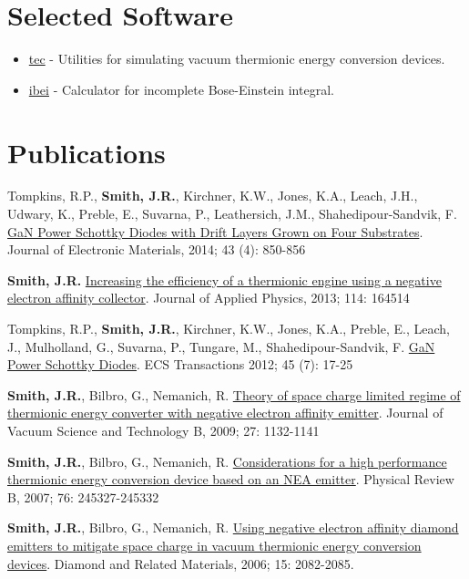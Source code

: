 \section{Selected Software}

\begin{itemize}
\tightlist
\item
  \href{http://jrsmith3.github.io/tec/}{tec} - Utilities for simulating
  vacuum thermionic energy conversion devices.
\item
  \href{http://ibei.readthedocs.org/en/latest/}{ibei} - Calculator for
  incomplete Bose-Einstein integral.
\end{itemize}

\section{Publications}

Tompkins, R.P., \textbf{Smith, J.R.}, Kirchner, K.W., Jones, K.A.,
Leach, J.H., Udwary, K., Preble, E., Suvarna, P., Leathersich, J.M.,
Shahedipour-Sandvik, F.
\href{http://dx.doi.org/10.1007/s11664-014-3021-9}{GaN Power Schottky
Diodes with Drift Layers Grown on Four Substrates}. Journal of
Electronic Materials, 2014; 43 (4): 850-856

\textbf{Smith, J.R.}
\href{http://dx.doi.org/10.1063/1.4826202}{Increasing the efficiency of
a thermionic engine using a negative electron affinity collector}.
Journal of Applied Physics, 2013; 114: 164514

Tompkins, R.P., \textbf{Smith, J.R.}, Kirchner, K.W., Jones, K.A.,
Preble, E., Leach, J., Mulholland, G., Suvarna, P., Tungare, M.,
Shahedipour-Sandvik, F. \href{http://dx.doi.org/10.1149/1.3701521}{GaN
Power Schottky Diodes}. ECS Transactions 2012; 45 (7): 17-25

\textbf{Smith, J.R.}, Bilbro, G., Nemanich, R.
\href{http://dx.doi.org/10.1116/1.3125282}{Theory of space charge
limited regime of thermionic energy converter with negative electron
affinity emitter}. Journal of Vacuum Science and Technology B, 2009; 27:
1132-1141

\textbf{Smith, J.R.}, Bilbro, G., Nemanich, R.
\href{http://dx.doi.org/10.1103/PhysRevB.76.245327}{Considerations for a
high performance thermionic energy conversion device based on an NEA
emitter}. Physical Review B, 2007; 76: 245327-245332

\textbf{Smith, J.R.}, Bilbro, G., Nemanich, R.
\href{http://dx.doi.org/10.1016/j.diamond.2006.09.011}{Using negative
electron affinity diamond emitters to mitigate space charge in vacuum
thermionic energy conversion devices}. Diamond and Related Materials,
2006; 15: 2082-2085.


